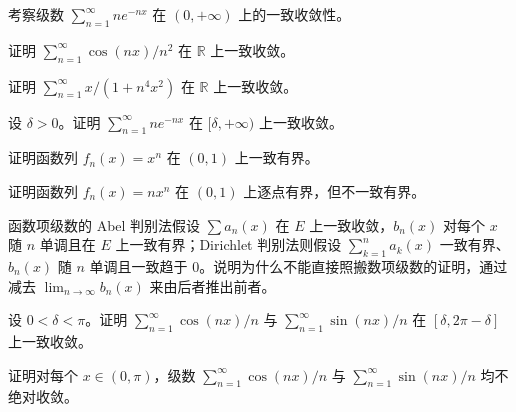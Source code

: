 \newpage
\noindent\begin{minipage}{\textwidth}
考察级数 $\sum_{n=1}^{\infty}ne^{-nx}$ 在 $(0,+\infty)$ 上的一致收敛性。
\end{minipage}\par\vfill
\noindent\begin{minipage}{\textwidth}
证明 $\sum_{n=1}^{\infty}\cos(nx)/n^2$ 在 $\mathbb R$ 上一致收敛。
\end{minipage}\par\vfill
\noindent\begin{minipage}{\textwidth}
证明 $\sum_{n=1}^{\infty}x/(1+n^4x^2)$ 在 $\mathbb R$ 上一致收敛。
\end{minipage}\par\vfill
\newpage
\noindent\begin{minipage}{\textwidth}
设 $\delta>0$。证明 $\sum_{n=1}^{\infty}ne^{-nx}$ 在 $[\delta,+\infty)$ 上一致收敛。
\end{minipage}\par\vfill
\noindent\begin{minipage}{\textwidth}
证明函数列 $f_n(x)=x^n$ 在 $(0,1)$ 上一致有界。
\end{minipage}\par\vfill
\noindent\begin{minipage}{\textwidth}
证明函数列 $f_n(x)=nx^n$ 在 $(0,1)$ 上逐点有界，但不一致有界。
\end{minipage}\par\vfill
\newpage
\noindent\begin{minipage}{\textwidth}
函数项级数的 Abel 判别法假设 $\sum a_n(x)$ 在 $E$ 上一致收敛，$b_n(x)$ 对每个 $x$ 随 $n$ 单调且在 $E$ 上一致有界；Dirichlet 判别法则假设 $\sum_{k=1}^na_k(x)$ 一致有界、$b_n(x)$ 随 $n$ 单调且一致趋于 $0$。说明为什么不能直接照搬数项级数的证明，通过减去 $\lim_{n\to\infty}b_n(x)$ 来由后者推出前者。
\end{minipage}\par\vfill
\noindent\begin{minipage}{\textwidth}
设 $0<\delta<\pi$。证明 $\sum_{n=1}^{\infty}\cos(nx)/n$ 与 $\sum_{n=1}^{\infty}\sin(nx)/n$ 在 $[\delta,2\pi-\delta]$ 上一致收敛。
\end{minipage}\par\vfill
\noindent\begin{minipage}{\textwidth}
证明对每个 $x\in(0,\pi)$，级数 $\sum_{n=1}^{\infty}\cos(nx)/n$ 与 $\sum_{n=1}^{\infty}\sin(nx)/n$ 均不绝对收敛。
\end{minipage}\par\vfill
